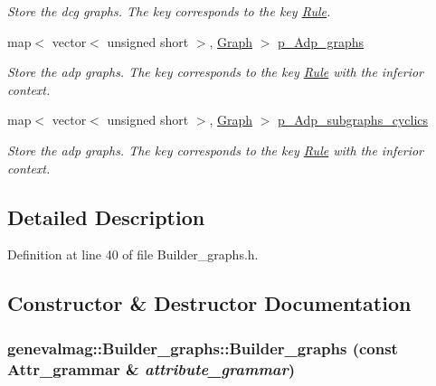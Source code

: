 \begin{CompactItemize}
\begin{CompactList}\small\item\em Store the dcg graphs. The key corresponds to the key \hyperlink{classgenevalmag_1_1Rule}{Rule}. \item\end{CompactList}\item 
map$<$ vector$<$ unsigned short $>$, \hyperlink{namespacegenevalmag_4a96de9ebfc7d48233406ab9cad55cb5}{Graph} $>$ \hyperlink{classgenevalmag_1_1Builder__graphs_75e37bb5a6f499fdd57f97061e313ec5}{p\_\-Adp\_\-graphs}
\begin{CompactList}\small\item\em Store the adp graphs. The key corresponds to the key \hyperlink{classgenevalmag_1_1Rule}{Rule} with the inferior context. \item\end{CompactList}\item 
map$<$ vector$<$ unsigned short $>$, \hyperlink{namespacegenevalmag_4a96de9ebfc7d48233406ab9cad55cb5}{Graph} $>$ \hyperlink{classgenevalmag_1_1Builder__graphs_54a45b424086582d4ed7bb99b948a956}{p\_\-Adp\_\-subgraphs\_\-cyclics}
\begin{CompactList}\small\item\em Store the adp graphs. The key corresponds to the key \hyperlink{classgenevalmag_1_1Rule}{Rule} with the inferior context. \item\end{CompactList}\end{CompactItemize}


\subsection{Detailed Description}


Definition at line 40 of file Builder\_\-graphs.h.

\subsection{Constructor \& Destructor Documentation}
\hypertarget{classgenevalmag_1_1Builder__graphs_6220015a296aed77686fd9382e2917e3}{
\subsubsection[{Builder\_\-graphs}]{\setlength{\rightskip}{0pt plus 5cm}genevalmag::Builder\_\-graphs::Builder\_\-graphs (const {\bf Attr\_\-grammar} \& {\em attribute\_\-grammar})}}
\label{classgenevalmag_1_1Builder__graphs_6220015a296aed77686fd9382e2917e3}


